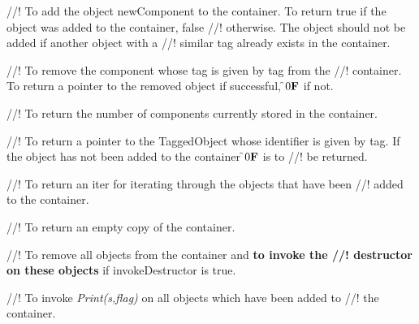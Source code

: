 //! To add the object \p newComponent to the container. To return
\p true if the object was added to the container, \p false
//! otherwise. The object should not be added if another object with a
//! similar tag already exists in the container.
 
//! To remove the component whose tag is given by \p tag from the
//! container. To return a pointer to the removed object if successful,
\f$0{\bf F}$ if not. 

//! To return the number of components currently stored in the container.

//! To return a pointer to the TaggedObject whose identifier is given by
\p tag. If the object has not been added to the container \f$0{\bf F}$ is to
//! be returned.

//! To return an iter for iterating through the objects that have been
//! added to the container.

//! To return an empty copy of the container.

//! To remove all objects from the container and {\bf to invoke the
//! destructor on these objects} if \p invokeDestructor is \p true.

//! To invoke {\em Print(s,flag)} on all objects which have been added to
//! the container. 






